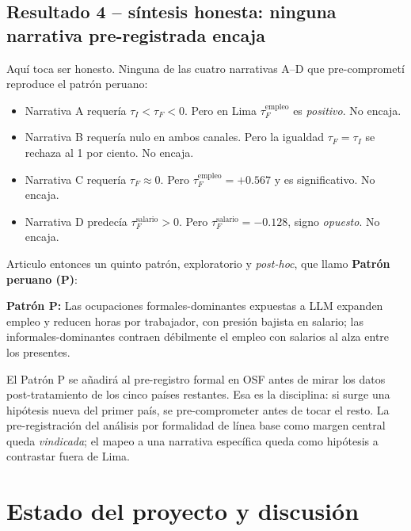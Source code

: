 \documentclass[12pt]{article}
\begin{document}
\subsection{Resultado 4 -- síntesis honesta: ninguna narrativa pre-registrada encaja}

Aquí toca ser honesto. Ninguna de las cuatro narrativas A--D que pre-comprometí reproduce el patrón peruano:

\begin{itemize}
  \item Narrativa A requería $\tau_I < \tau_F < 0$. Pero en Lima $\tau_F^{\text{empleo}}$ es \emph{positivo}. No encaja.
  \item Narrativa B requería nulo en ambos canales. Pero la igualdad $\tau_F = \tau_I$ se rechaza al 1 por ciento. No encaja.
  \item Narrativa C requería $\tau_F \approx 0$. Pero $\tau_F^{\text{empleo}} = +0.567$ y es significativo. No encaja.
  \item Narrativa D predecía $\tau_F^{\text{salario}} > 0$. Pero $\tau_F^{\text{salario}} = -0.128$, signo \emph{opuesto}. No encaja.
\end{itemize}

Articulo entonces un quinto patrón, exploratorio y \emph{post-hoc}, que llamo \textbf{Patrón peruano (P)}:

\begin{ideaclave}
\textbf{Patrón P:} Las ocupaciones formales-dominantes expuestas a LLM expanden empleo y reducen horas por trabajador, con presión bajista en salario; las informales-dominantes contraen débilmente el empleo con salarios al alza entre los presentes.
\end{ideaclave}

El Patrón P se añadirá al pre-registro formal en OSF antes de mirar los datos post-tratamiento de los cinco países restantes. Esa es la disciplina: si surge una hipótesis nueva del primer país, se pre-comprometer antes de tocar el resto. La pre-registración del análisis por formalidad de línea base como margen central queda \emph{vindicada}; el mapeo a una narrativa específica queda como hipótesis a contrastar fuera de Lima.

\section{Estado del proyecto y discusión}
\end{document}
